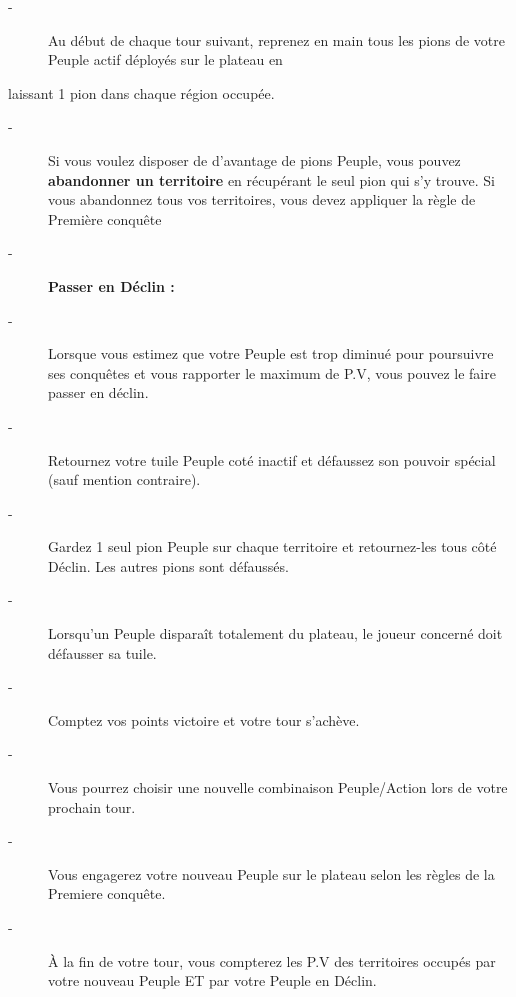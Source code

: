 \documentclass{scrartcl}%
\begin{document}
%
\begin{description}%
\item[{-} ]%
%
 Au début de chaque tour suivant, reprenez en main tous les pions de votre Peuple actif déployés sur le plateau en
%
\end{description}%
laissant 1 pion dans chaque région occupée.
%
\begin{description}%
\item[{-} ]%
%
 Si vous voulez disposer de d'avantage de pions Peuple, vous pouvez %
\textbf{abandonner un territoire}%
\textit{ }%
 en récupérant le seul pion qui s'y trouve. Si vous abandonnez tous vos territoires, vous devez appliquer la règle de Première conquête
%
\item[{-} ]%
%
\textbf{Passer en Déclin :}%

%
\item[{-} ]%
%
 Lorsque vous estimez que votre Peuple est trop diminué pour poursuivre ses conquêtes et vous rapporter le maximum de P.V, vous pouvez le faire passer en déclin.
%
\item[{-} ]%
%
 Retournez votre tuile Peuple coté inactif et défaussez son pouvoir spécial (sauf mention contraire).
%
\item[{-} ]%
%
 Gardez 1 seul pion Peuple sur chaque territoire et retournez{-}les tous côté Déclin. Les autres pions sont défaussés.
%
\item[{-} ]%
%
 Lorsqu'un Peuple disparaît totalement du plateau, le joueur concerné doit défausser sa tuile.
%
\item[{-} ]%
%
 Comptez vos points victoire et votre tour s’achève.
%
\item[{-} ]%
%
 Vous pourrez choisir une nouvelle combinaison Peuple/Action lors de votre prochain tour.
%
\item[{-} ]%
%
 Vous engagerez votre nouveau Peuple sur le plateau selon les règles de la Premiere conquête.
%
\item[{-} ]%
%
 À la fin de votre tour, vous compterez les P.V des territoires occupés par votre nouveau Peuple ET par votre Peuple en Déclin.
%
\end{description}

%
\end{document}
